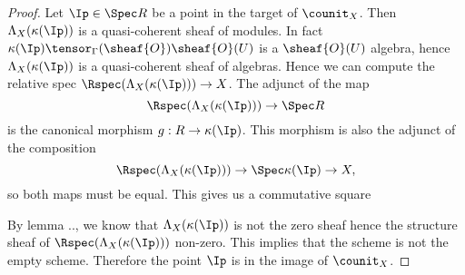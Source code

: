 \begin{proof}
Let $\Ip\in \Spec R$ be a point in the target of $\counit_X$.
Then $\Lambda_X(\kappa(\Ip))$ is a quasi-coherent sheaf of modules.
In fact $\kappa(\Ip)\tensor_\Gamma(\sheaf{O}) \sheaf{O}(U)$ is a $\sheaf{O}(U)$ algebra, hence $\Lambda_X(\kappa(\Ip))$ is a quasi-coherent sheaf of algebras.
Hence we can compute the relative spec $\Rspec(\Lambda_X(\kappa(\Ip)))\rightarrow X$. The adjunct of the map
\[\Rspec(\Lambda_X(\kappa(\Ip)))\rightarrow \Spec R\] is the canonical morphism $g:R\rightarrow \kappa(\Ip)$. 
This morphism is also the adjunct of the composition
\[\Rspec(\Lambda_X(\kappa(\Ip)))\rightarrow \Spec \kappa(\Ip)\rightarrow X,\]
so both maps must be equal. This gives us a commutative square

\begin{center}
\end{center}

By lemma .., we know that $\Lambda_X(\kappa(\Ip))$ is not the zero sheaf hence the structure sheaf of $\Rspec(\Lambda_X(\kappa(\Ip)))$ non-zero.
This implies that the scheme is not the empty scheme. Therefore the point $\Ip$ is in the image of $\counit_X$.
\end{proof}
